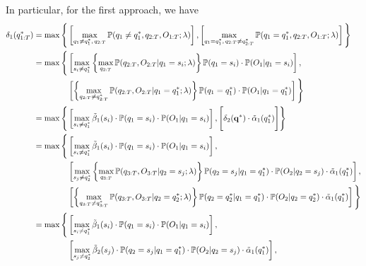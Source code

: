 In particular, for the first approach, we have
\begin{equation*}
\begin{split}
\delta_1(q_{1:T}^*) 
= \max \Bigg\{ & \left[ \max_{q_1 \ne q_1^*, \, q_{2:T}} \p(q_1 \ne q_1^*, q_{2:T}, O_{1:T}; \lambda) \right],
                 \left[ \max_{q_1 = q_1^*, \, q_{2:T} \ne q_{2:T}^*} \p(q_1 = q_1^*, q_{2:T}, O_{1:T}; \lambda) \right] \Bigg\} \\
= \max \Bigg\{ & \left[ \max_{s_i \ne q_1^*} \left\{ \max_{q_{2:T}} \p(q_{2:T}, O_{2:T} |q_1 = s_i; \lambda) \right\} 
                 \p(q_1 = s_i) \cdot \p(O_1 |q_1 = s_i) \right], \\ 
               & \left[ \left\{ \max_{q_{2:T} \ne q_{2:T}^*} \p(q_{2:T}, O_{2:T} |q_1 = q_1^*; \lambda) \right\}
                 \p(q_1 = q_1^*) \cdot \p(O_1 |q_1 = q_1^*) \right] \Bigg\} \\
= \max \Bigg\{ & \left[ \max_{s_i \ne q_1^*} \betat_1(s_i) \cdot \p(q_1 = s_i) \cdot \p(O_1 |q_1 = s_i) \right], 
                 \Bigg[ \delta_2(\q^*) \cdot \alphat_1(q_1^*) \Bigg] \Bigg\} \\
= \max \Bigg\{ & \left[ \max_{s_i \ne q_1^*} \betat_1(s_i) \cdot \p(q_1 = s_i) \cdot \p(O_1 |q_1 = s_i) \right], \\
               & \left[ \max_{s_j \ne q_2^*} \left\{ \max_{q_{3:T}} \p(q_{3:T}, O_{3:T} |q_2 = s_j; \lambda) \right\} \p(q_2 = s_j |q_1 = q_1^*) 
                 \cdot \p(O_2 |q_2 = s_j) \cdot \alphat_1(q_1^*) \right], \\
               & \left[ \left\{ \max_{q_{3:T} \ne q_{3:T}^*} \p(q_{3:T}, O_{3:T} |q_2 = q_2^*; \lambda) \right\}
                 \p(q_2 = q_2^* |q_1 = q_1^*) \cdot \p(O_2 |q_2 = q_2^*) \cdot \alphat_1(q_1^*) \right] \Bigg\} \\
= \max \Bigg\{ & \left[ \max_{s_i \ne q_1^*} \betat_1(s_i) \cdot \p(q_1 = s_i) \cdot \p(O_1 |q_1 = s_i) \right], \\
               & \left[ \max_{s_j \ne q_2^*} \betat_2(s_j) \cdot \p(q_2 = s_j |q_1 = q_1^*) \cdot \p(O_2 |q_2 = s_j) \cdot \alphat_1(q_1^*) \right], \\

\end{split}
\end{equation*}
